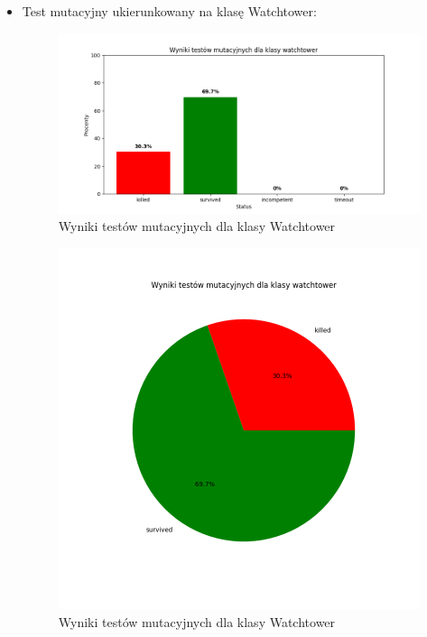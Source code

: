 \documentclass[12pt,a4paper]{article}
\begin{document}
\begin{enumerate}
\begin{itemize}
                    
                \item Test mutacyjny ukierunkowany na klasę Watchtower:
                    \begin{figure}[H]
                        \centering
                        \includegraphics[width=0.8\linewidth]{media/wykresy/bar_watchtower_mutual_test.png}
                        \caption{Wyniki testów mutacyjnych dla klasy Watchtower}
                        \label{fig:enter-label}
                    \end{figure}
                    \begin{figure}[H]
                        \centering
                        \includegraphics[width=0.8\linewidth]{media/wykresy/pie_watchtower_mutual_test.png}
                        \caption{Wyniki testów mutacyjnych dla klasy Watchtower}
                        \label{fig:enter-label}
                    \end{figure}


\end{itemize}
\end{enumerate}
\end{document}
